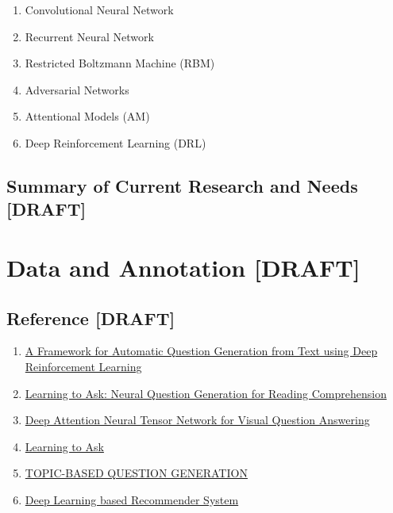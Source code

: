 \documentclass[]{book}
\theoremstyle{definition}
\theoremstyle{definition}
\theoremstyle{definition}
\theoremstyle{remark}
\begin{document}
\begin{enumerate}
\def\labelenumi{\arabic{enumi}.}
\setcounter{enumi}{1}
\item
  Convolutional Neural Network
\item
  Recurrent Neural Network
\item
  Restricted Boltzmann Machine (RBM)
\item
  Adversarial Networks
\item
  Attentional Models (AM)
\item
  Deep Reinforcement Learning (DRL)
\end{enumerate}

\subsection{Summary of Current Research and Needs
{[}DRAFT{]}}\label{summary-of-current-research-and-needs-draft}

\section{Data and Annotation
{[}DRAFT{]}}\label{data-and-annotation-draft}

\subsection{Reference {[}DRAFT{]}}\label{reference-draft}

\begin{enumerate}
\def\labelenumi{\arabic{enumi}.}
\item
  \href{https://arxiv.org/pdf/1808.04961.pdf}{A Framework for Automatic
  Question Generation from Text using Deep Reinforcement Learning}
\item
  \href{https://arxiv.org/pdf/1705.00106.pdf}{Learning to Ask: Neural
  Question Generation for Reading Comprehension}
\item
  \href{http://openaccess.thecvf.com/content_ECCV_2018/papers/Yalong_Bai_Deep_Attention_Neural_ECCV_2018_paper.pdf}{Deep
  Attention Neural Tensor Network for Visual Question Answering}
\item
  \href{http://www.cs.cornell.edu/~xdu/papers/acl17_dsc_poster.pdf}{Learning
  to Ask}
\item
  \href{https://openreview.net/pdf?id=rk3pnae0b}{TOPIC-BASED QUESTION
  GENERATION}
\item
  \href{https://arxiv.org/pdf/1707.07435.pdf}{Deep Learning based
  Recommender System}
\end{enumerate}
\end{document}
